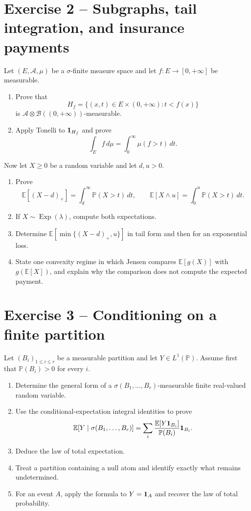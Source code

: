 \section*{Exercise 2 -- Subgraphs, tail integration, and insurance payments}

Let $(E,\mathcal A,\mu)$ be a $\sigma$-finite measure space and let $f:E\to[0,+\infty]$ be measurable.
\begin{enumerate}
  \item Prove that
  \[
  H_f=\{(x,t)\in E\times(0,+\infty):t<f(x)\}
  \]
  is $\mathcal A\otimes\mathcal B((0,+\infty))$-measurable.
  \item Apply Tonelli to $\mathbf 1_{H_f}$ and prove
  \[
  \int_Ef\,d\mu
  =
  \int_0^\infty\mu(f>t)\,dt.
  \]
\end{enumerate}
Now let $X\ge0$ be a random variable and let $d,u>0$.
\begin{enumerate}[resume]
  \item Prove
  \[
  \mathbb E[(X-d)_+]
  =
  \int_d^\infty\mathbb P(X>t)\,dt,
  \qquad
  \mathbb E[X\wedge u]
  =
  \int_0^u\mathbb P(X>t)\,dt.
  \]
  \item If $X\sim\operatorname{Exp}(\lambda)$, compute both expectations.
  \item Determine $\mathbb E[\min\{(X-d)_+,u\}]$ in tail form and then for an exponential loss.
  \item State one convexity regime in which Jensen compares $\mathbb E[g(X)]$ with $g(\mathbb E[X])$, and explain why the comparison does not compute the expected payment.
\end{enumerate}

\section*{Exercise 3 -- Conditioning on a finite partition}

Let $(B_i)_{1\le i\le r}$ be a measurable partition and let $Y\in L^1(\mathbb P)$. Assume first that $\mathbb P(B_i)>0$ for every $i$.
\begin{enumerate}
  \item Determine the general form of a $\sigma(B_1,\ldots,B_r)$-measurable finite real-valued random variable.
  \item Use the conditional-expectation integral identities to prove
  \[
  \mathbb E[Y\mid\sigma(B_1,\ldots,B_r)]
  =
  \sum_i
  \frac{\mathbb E[Y\mathbf 1_{B_i}]}{\mathbb P(B_i)}\mathbf 1_{B_i}.
  \]
  \item Deduce the law of total expectation.
  \item Treat a partition containing a null atom and identify exactly what remains undetermined.
  \item For an event $A$, apply the formula to $Y=\mathbf 1_A$ and recover the law of total probability.
\end{enumerate}

